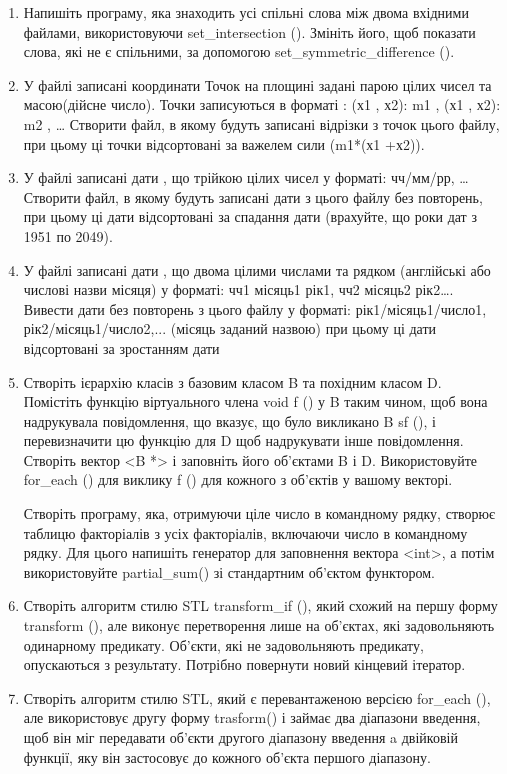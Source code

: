 \documentclass[a5paper,titlepage,openany,twoside,
]
{book_unv}%
\begin{document}
\begin{enumerate}
\begin{enumerate}
\begin{enumerate}
\item
  Напишіть програму, яка знаходить усі спільні слова між двома вхідними
  файлами, використовуючи set\_intersection (). Змініть його, щоб
  показати слова, які не є спільними, за допомогою
  set\_symmetric\_difference ().

\item
  У файлі записані координати Точок на площині задані парою цілих чисел
  та масою(дійсне число). Точки записуються в форматі : (х1 , х2): m1 ,
  (х1 , х2): m2 , \ldots{} Створити файл, в якому будуть записані
  відрізки з точок цього файлу, при цьому ці точки відсортовані за
  важелем сили (m1*(х1 +х2)).
\item
  У файлі записані дати , що трійкою цілих чисел у форматі: чч/мм/рр,
  \ldots{} Створити файл, в якому будуть записані дати з цього файлу без
  повторень, при цьому ці дати відсортовані за спадання дати (врахуйте,
  що роки дат з 1951 по 2049).
\item
  У файлі записані дати , що двома цілими числами та рядком (англійські
  або числові назви місяця) у форматі: чч1 місяць1 рік1, чч2 місяць2
  рік2\ldots{}. Вивести дати без повторень з цього файлу у форматі:
  рік1/місяць1/число1, рік2/місяць1/число2,... (місяць заданий назвою)
  при цьому ці дати відсортовані за зростанням дати
\item
  Створіть ієрархію класів з базовим класом B та похідним класом D.
  Помістіть функцію віртуального члена void f () у B таким чином, щоб
  вона надрукувала повідомлення, що вказує, що було викликано B sf (), і
  перевизначити цю функцію для D щоб надрукувати інше повідомлення.
  Створіть вектор \textless{}B *\textgreater{} і заповніть його
  об'єктами B і D. Використовуйте for\_each () для виклику f () для
  кожного з об'єктів у вашому векторі.

Створіть програму, яка, отримуючи ціле число в командному рядку,
  створює таблицю факторіалів з усіх факторіалів, включаючи число в
  командному рядку. Для цього напишіть генератор для заповнення вектора
  \textless{}int\textgreater{}, а потім використовуйте partial\_sum() 
зі стандартним об'єктом функтором.

\item
  Створіть алгоритм стилю STL transform\_if (), який схожий на першу форму
  transform (), але виконує перетворення лише на об'єктах, які
  задовольняють одинарному предикату. Об'єкти, які не задовольняють
  предикату, опускаються з результату. Потрібно повернути новий кінцевий
  ітератор.
\item
  Створіть алгоритм стилю STL, який є перевантаженою версією for\_each
  (), але використовує другу форму trasform() і займає два діапазони
  введення, щоб він міг передавати об'єкти другого діапазону введення a
  двійковій функції, яку він застосовує до кожного об'єкта першого
  діапазону.


\end{enumerate}
\end{enumerate}
\end{enumerate}
\end{document}
